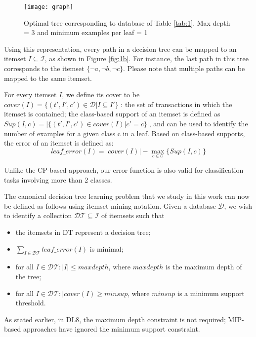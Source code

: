 \begin{figure}
	\texttt{[image: graph]}
	\caption{Optimal tree corresponding to database of Table \ref{tab:1}. Max depth = 3 and minimum examples per leaf = 1}
	\label{fig:1}
\end{figure}
Using this representation, every path in a decision tree can be mapped to an itemset $I \subseteq \mathcal{I}$, as shown in Figure \ref{fig:1b}. For instance, the last path in this tree corresponds to the itemset $\{\neg a, \neg b, \neg c\}$. Please note that multiple paths can be mapped
to the same itemset.

For every itemset $I$, we define its cover to be $cover (I) = \{(t', I' , c') \in \mathcal{D} | I \subseteq I'\}$ : the set of transactions in which the itemset is contained; the class-based support of an itemset is defined as $Sup(I, c) = |\{(t', I', c')\in cover (I)| c' = c\}|$, and can be used to identify the number of examples for a given class c in a leaf. Based on class-based supports, the error of an itemset is defined as:
\begin{equation}
	leaf\_error(I) =| cover(I) | - \max_{c\in\mathcal{C}}\{Sup(I,c)\}
	\label{eq:1}
\end{equation}

Unlike the CP-based approach, our error function is also valid for classification tasks involving more than 2 classes.

The canonical decision tree learning problem that we
study in this work can now be defined as follows using itemset mining notation. Given a database $\mathcal{D}$, we wish to identify a collection $\mathcal{DT} \subseteq \mathcal{I}$ of itemsets such that
\begin{itemize}
	\item the itemsets in DT represent a decision tree;
	\item $\sum_{I\in\mathcal{DT}} leaf\_error(I)$ is minimal;
	\item for all $I\in\mathcal{DT} : |I| \le maxdepth$, where $maxdepth$ is the maximum depth of the tree;
	\item for all $I\in\mathcal{DT} :| cover(I) \ge minsup$, where $minsup$ is a minimum support threshold.
\end{itemize}
As stated earlier, in DL8, the maximum depth constraint is not required; MIP-based approaches have ignored the minimum support constraint.
